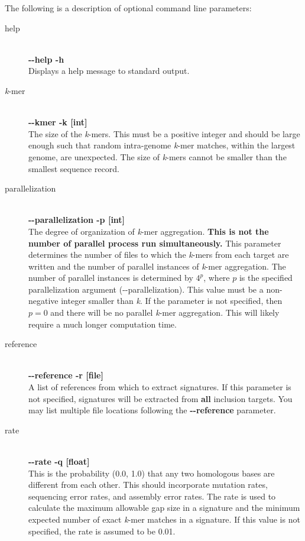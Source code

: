 \documentclass[a4paper,10pt]{article}
\begin{document}
The following is a description of optional command line parameters:

\begin{description}

  \item[help] \hfill \\
  \textbf{-{}-help -h} \hfill \\
  Displays a help message to standard output.
  
  \item[\textit{k}-mer] \hfill \\
  \textbf{-{}-kmer -k [int]} \hfill \\
  The size of the \textit{k}-mers. This must be a positive integer and should be large enough such that random intra-genome \textit{k}-mer matches, within the largest genome, are unexpected. The size of \textit{k}-mers cannot be smaller than the smallest sequence record.
  
  \item[parallelization] \hfill \\
  \textbf{-{}-parallelization -p [int]} \hfill \\
  The degree of organization of \textit{k}-mer aggregation. \textbf{This is not the number of parallel process run simultaneously.} This parameter determines the number of files to which the \textit{k}-mers from each target are written and the number of parallel instances of \textit{k}-mer aggregation. The number of parallel instances is determined by \(4^{p}\), where \(p\) is the specified parallelization argument (\mbox{-{}-parallelization}). This value must be a non-negative integer smaller than \textit{k}. If the parameter is not specified, then \(p = 0\) and there will be no parallel \textit{k}-mer aggregation. This will likely require a much longer computation time.
  
  \item[reference] \hfill \\
  \textbf{-{}-reference -r [file]} \hfill \\
  A list of references from which to extract signatures. If this parameter is not specified, signatures will be extracted from \textbf{all} inclusion targets. You may list multiple file locations following the \textbf{-{}-reference} parameter.
  
  \item[rate] \hfill \\
  \textbf{-{}-rate -q [float]} \hfill \\
  This is the probability (0.0, 1.0) that any two homologous bases are different from each other. This should incorporate mutation rates, sequencing error rates, and assembly error rates. The rate is used to calculate the maximum allowable gap size in a signature and the minimum expected number of exact \textit{k}-mer matches in a signature. If this value is not specified, the rate is assumed to be 0.01.
  

\end{description}
\end{document}
